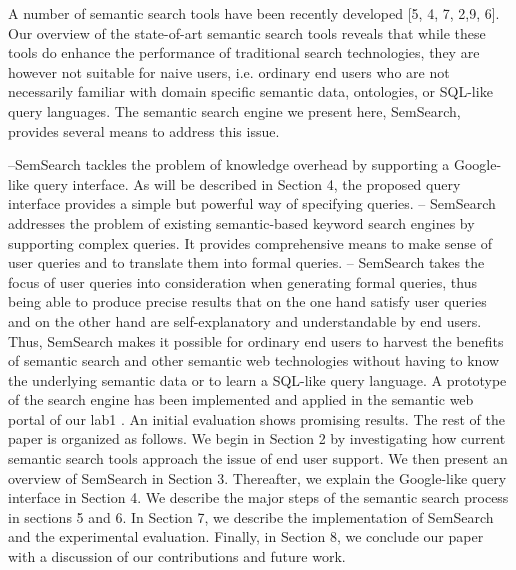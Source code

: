 \documentclass[12pt,a4]{article}
\begin{document}
A number of semantic search tools have been recently developed [5, 4, 7, 2,9, 6]. Our overview of the state-of-art semantic search tools reveals that while these tools do enhance the performance of traditional search technologies, they are however not suitable for naive users, i.e. ordinary end users who are not necessarily familiar with domain specific semantic data, ontologies, or SQL-like query languages. The semantic search engine we present here, SemSearch, provides several means to address this issue.


--SemSearch tackles the problem of knowledge overhead by supporting a Google-
like query interface. As will be described in Section 4, the proposed query
interface provides a simple but powerful way of specifying queries.
– SemSearch addresses the problem of existing semantic-based keyword search
engines by supporting complex queries. It provides comprehensive means to
make sense of user queries and to translate them into formal queries.
– SemSearch takes the focus of user queries into consideration when generating
formal queries, thus being able to produce precise results that on the one
hand satisfy user queries and on the other hand are self-explanatory and
understandable by end users.
Thus, SemSearch makes it possible for ordinary end users to harvest the
benefits of semantic search and other semantic web technologies without having
to know the underlying semantic data or to learn a SQL-like query language. A
prototype of the search engine has been implemented and applied in the semantic
web portal of our lab1 . An initial evaluation shows promising results.
The rest of the paper is organized as follows. We begin in Section 2 by
investigating how current semantic search tools approach the issue of end user
support. We then present an overview of SemSearch in Section 3. Thereafter,
we explain the Google-like query interface in Section 4. We describe the major
steps of the semantic search process in sections 5 and 6. In Section 7, we describe
the implementation of SemSearch and the experimental evaluation. Finally, in
Section 8, we conclude our paper with a discussion of our contributions and
future work.
\textsc{}
\end{document}
